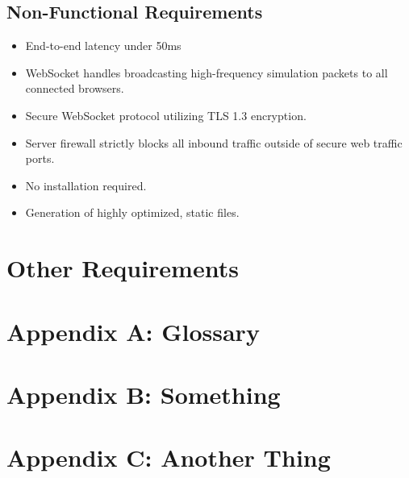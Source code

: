 \documentclass[12pt]{article}
\begin{document}
\subsection{Non-Functional Requirements} 
\begin{itemize} 
	\item End-to-end latency under 50ms 
	\item WebSocket handles broadcasting high-frequency simulation packets to all connected browsers. 
	\item Secure WebSocket protocol utilizing TLS 1.3 encryption. 
	\item Server firewall strictly blocks all inbound traffic outside of secure web traffic ports. 
	\item No installation required. 
	\item Generation of highly optimized, static files. 
\end{itemize} 

\newpage
\section{Other Requirements} 

\newpage
\section{Appendix A: Glossary} 

\newpage
\section{Appendix B: Something} 

\newpage
\section{Appendix C: Another Thing} 
\end{document}
